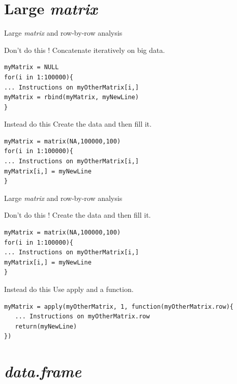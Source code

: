 \documentclass[10pt]{beamer}
\newcommand{\df}{{\it data.frame} }
\newcommand{\mat}{{\it matrix} }
\begin{document}
\section{Large \mat}

\begin{frame}[fragile]{Large \mat and row-by-row analysis}
  \begin{alertblock}{Don't do this !}
    Concatenate iteratively on big data.

\begin{verbatim}
myMatrix = NULL
for(i in 1:100000){
... Instructions on myOtherMatrix[i,]
myMatrix = rbind(myMatrix, myNewLine)
}
\end{verbatim}  
  \end{alertblock}
  \begin{exampleblock}{Instead do this}
    Create the data and then fill it.

\begin{verbatim}
myMatrix = matrix(NA,100000,100)
for(i in 1:100000){
... Instructions on myOtherMatrix[i,]
myMatrix[i,] = myNewLine
}
\end{verbatim}  
  \end{exampleblock}
\end{frame}

\begin{frame}[fragile, shrink=10]{Large \mat and row-by-row analysis}

  \begin{alertblock}{Don't do this !}
    Create the data and then fill it.
    
\begin{verbatim}
myMatrix = matrix(NA,100000,100)
for(i in 1:100000){
... Instructions on myOtherMatrix[i,]
myMatrix[i,] = myNewLine
}
\end{verbatim}  
  \end{alertblock}
  \begin{exampleblock}{Instead do this}
    Use {\sf apply} and a function.
    
\begin{verbatim}
myMatrix = apply(myOtherMatrix, 1, function(myOtherMatrix.row){
   ... Instructions on myOtherMatrix.row
   return(myNewLine)
})
\end{verbatim}  
  \end{exampleblock}
\end{frame}


\section{\df}
\end{document}
